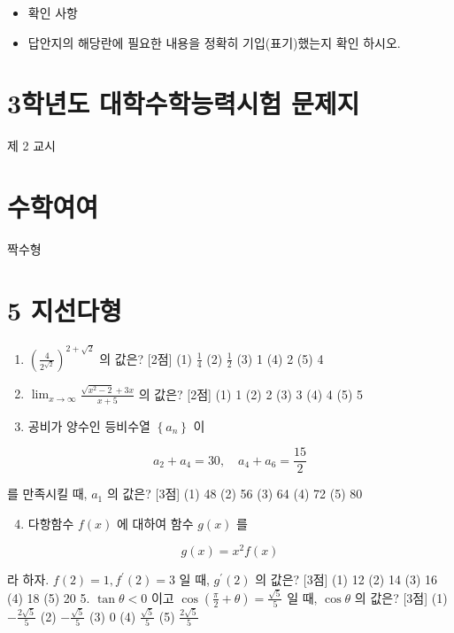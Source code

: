 \documentclass[10pt]{article}
\begin{document}
\begin{itemize}
  \item 확인 사항
\end{itemize}

\begin{itemize}
  \item 답안지의 해당란에 필요한 내용을 정확히 기입(표기)했는지 확인 하시오.
\end{itemize}

\section{3학년도 대학수학능력시험 문제지}
제 2 교시

\section{수학여여}
짝수형

\section{5 지선다형}
\begin{enumerate}
  \item $\left(\frac{4}{2^{\sqrt{2}}}\right)^{2+\sqrt{2}}$ 의 값은? [2점]
(1) $\frac{1}{4}$
(2) $\frac{1}{2}$
(3) 1
(4) 2
(5) 4

  \item $\lim _{x \rightarrow \infty} \frac{\sqrt{x^{2}-2}+3 x}{x+5}$ 의 값은? [2점]
(1) 1
(2) 2
(3) 3
(4) 4
(5) 5

  \item 공비가 양수인 등비수열 $\left\{a_{n}\right\}$ 이

\end{enumerate}

$$
a_{2}+a_{4}=30, \quad a_{4}+a_{6}=\frac{15}{2}
$$

를 만족시킬 때, $a_{1}$ 의 값은? [3점]
(1) 48
(2) 56
(3) 64
(4) 72
(5) 80

\begin{enumerate}
  \setcounter{enumi}{3}
  \item 다항함수 $f(x)$ 에 대하여 함수 $g(x)$ 를
\end{enumerate}

$$
g(x)=x^{2} f(x)
$$

라 하자. $f(2)=1, f^{\prime}(2)=3$ 일 때, $g^{\prime}(2)$ 의 값은? [3점]
(1) 12
(2) 14
(3) 16
(4) 18
(5) 20 5. $\tan \theta<0$ 이고 $\cos \left(\frac{\pi}{2}+\theta\right)=\frac{\sqrt{5}}{5}$ 일 때, $\cos \theta$ 의 값은? [3점]
(1) $-\frac{2 \sqrt{5}}{5}$
(2) $-\frac{\sqrt{5}}{5}$
(3) 0
(4) $\frac{\sqrt{5}}{5}$
(5) $\frac{2 \sqrt{5}}{5}$
\end{document}
